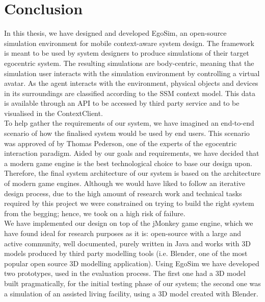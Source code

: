 \section{Conclusion} %
\label{sec:conclusion}

In this thesis, we have designed and developed EgoSim, an open-source simulation environment for mobile context-aware system design. The framework is meant to be used by system designers to produce simulations of their target egocentric system. The resulting simulations are body-centric, meaning that the simulation user interacts with the simulation environment by controlling a virtual avatar. As the agent interacts with the environment, physical objects and devices in its surroundings are classified according to the SSM context model. This data is available through an API to be accessed by third party service and to be visualised in the ContextClient.\\

To help gather the requirements of our system, we have imagined an end-to-end scenario of how the finalised system would be used by end users. This scenario was approved of by Thomas Pederson, one of the experts of the egocentric interaction paradigm. Aided by our goals and requirements, we have decided that a modern game engine is the best technological choice to base our design upon. Therefore, the final system architecture of our system is based on the architecture of modern game engines. Although we would have liked to follow an iterative design process, due to the high amount of research work and technical tasks required by this project we were constrained on trying to build the right system from the begging; hence, we took on a high risk of failure.\\

We have implemented our design on top of the jMonkey game engine, which we have found ideal for research purposes as it is: open-source with a large and active community, well documented, purely written in Java and works with 3D models produced by third party modelling tools (i.e. Blender, one of the most popular open source 3D modelling application). Using EgoSim we have developed two prototypes, used in the evaluation process. The first one had a 3D model built pragmatically, for the initial testing phase of our system; the second one was a simulation of an assisted living facility, using a 3D model created with Blender.\\

